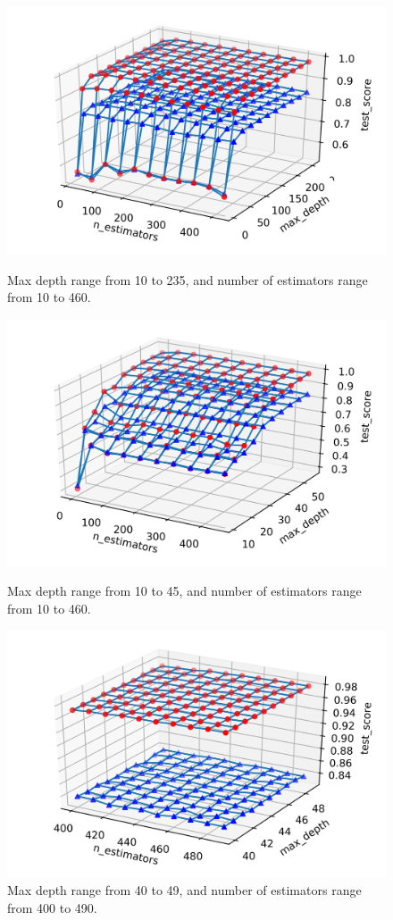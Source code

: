 \documentclass[11pt]{article}
\begin{document}
\begin{figure}[H]
  \includegraphics[width=\linewidth]{hyperparameter_tuning_1}
  \caption{Max depth range from 10 to 235, and number of estimators range from 10 to 460.}
  \label{fig:results}
\endminipage\hfill
{}
  \includegraphics[width=\linewidth]{hyperparameter_tuning_2}
  \caption{Max depth range from 10 to 45, and number of estimators range from 10 to 460.}
  \label{fig:results}
\endminipage\hfill
{}
  \begin{center}
  \includegraphics[width=0.5\linewidth]{hyperparameter_tuning_3}
  \caption{Max depth range from 40 to 49, and number of estimators range from 400 to 490.}
  \label{fig:results}
  \end{center}
\endminipage
\end{figure}
\end{document}
